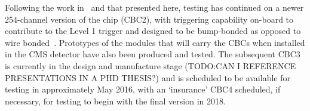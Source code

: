 Following the work in~\cite{JacobJA} and that presented here, testing has continued on a newer 254-channel
version of the chip (CBC2), with triggering capability on-board to contribute to the Level 1 trigger and
designed to be bump-bonded as opposed to wire bonded~\cite{Klein:1628930,Abbaneo:1452189}.
Prototypes of the modules that will carry the CBCs when installed in the CMS detector have also been produced
and tested. The subsequent CBC3 is currently in the design and manufacture stage (TODO:CAN I REFERENCE
PRESENTATIONS IN A PHD THESIS?) and is scheduled to be available for testing in approximately May 2016, with
an `insurance' CBC4 scheduled, if necessary, for testing to begin with the final version in 2018.

